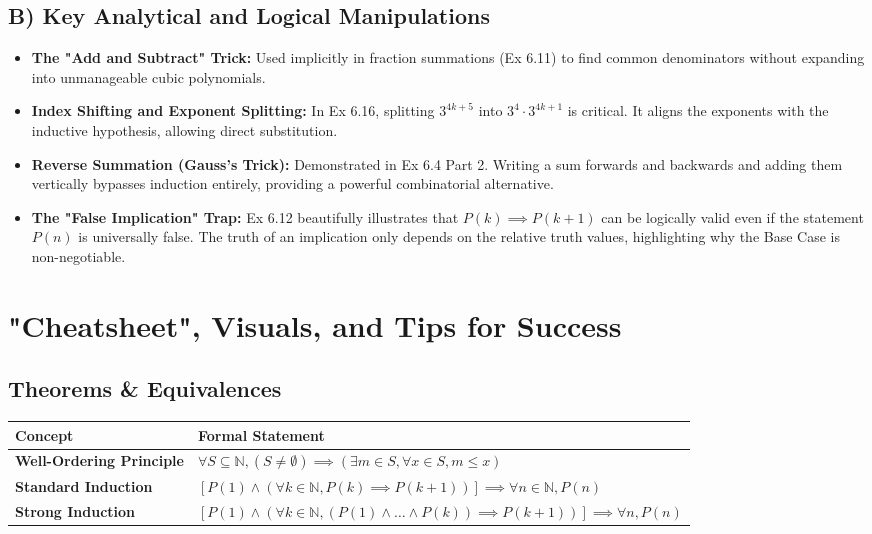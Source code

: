 \documentclass[11pt, a4paper]{article}
\theoremstyle{definition}
\theoremstyle{remark}
\newcommand{\N}{\mathbb{N}}
\begin{document}
\subsection{B) Key Analytical and Logical Manipulations}
\begin{itemize}
    \item \textbf{The "Add and Subtract" Trick:} Used implicitly in fraction summations (Ex 6.11) to find common denominators without expanding into unmanageable cubic polynomials.
    \item \textbf{Index Shifting and Exponent Splitting:} In Ex 6.16, splitting $3^{4k+5}$ into $3^4 \cdot 3^{4k+1}$ is critical. It aligns the exponents with the inductive hypothesis, allowing direct substitution.
    \item \textbf{Reverse Summation (Gauss's Trick):} Demonstrated in Ex 6.4 Part 2. Writing a sum forwards and backwards and adding them vertically bypasses induction entirely, providing a powerful combinatorial alternative.
    \item \textbf{The "False Implication" Trap:} Ex 6.12 beautifully illustrates that $P(k) \implies P(k+1)$ can be logically valid even if the statement $P(n)$ is universally false. The truth of an implication only depends on the relative truth values, highlighting why the Base Case is non-negotiable.
\end{itemize}

\newpage
\section{"Cheatsheet", Visuals, and Tips for Success}

\subsection{Theorems \& Equivalences}
\renewcommand{\arraystretch}{1.5}
\begin{tabularx}{\textwidth}{l X}
\toprule
\textbf{Concept} & \textbf{Formal Statement} \\
\midrule
\textbf{Well-Ordering Principle} & $\displaystyle \forall S \subseteq \N, (S \neq \emptyset) \implies (\exists m \in S, \forall x \in S, m \le x)$ \\
\textbf{Standard Induction} & $\displaystyle [P(1) \land (\forall k \in \N, P(k) \implies P(k+1))] \implies \forall n \in \N, P(n)$ \\
\textbf{Strong Induction} & $\displaystyle [P(1) \land (\forall k \in \N, (P(1) \land \dots \land P(k)) \implies P(k+1))] \implies \forall n, P(n)$ \\
\bottomrule
\end{tabularx}
\end{document}
